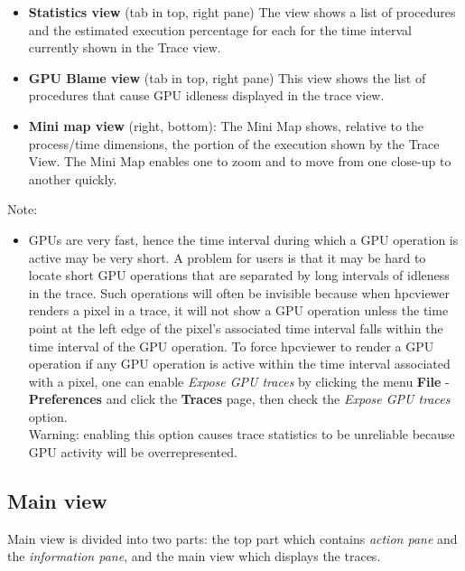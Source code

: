 \documentclass[english]{article}
\begin{document}
\begin{itemize}
\item \textbf{Statistics view} (tab in top, right pane)
  The view shows a list of procedures and the estimated execution percentage for each for the time interval currently shown in the Trace view.

\item \textbf{GPU Blame view} (tab in top, right pane)
	This view shows the list of procedures that cause GPU idleness displayed in the trace view.


\item \textbf{Mini map view} (right, bottom):
  The Mini Map shows, relative to the process/time dimensions, the portion of the execution shown by the Trace View.
  The Mini Map enables one to zoom and to move from one close-up to another quickly.

\end{itemize}
Note:
\begin{itemize}
\item GPUs are very fast, hence the time interval during which a GPU operation is active may be very short. A problem for users is that it may be hard to locate short GPU operations that are separated by long intervals of idleness in the trace. Such operations will often be invisible because
 when hpcviewer renders a pixel in a trace, it will not show a GPU operation unless the time point at the left edge of the pixel's associated time interval falls within the time interval of the GPU operation.
 	To force hpcviewer to render a GPU operation if any GPU operation is active within the time interval associated with a pixel, one can enable \emph{Expose GPU traces} by clicking the menu \textbf{File} - \textbf{Preferences} and click the \textbf{Traces} page, then check the \emph{Expose GPU traces} option.
\\
Warning: enabling this option causes trace statistics to be unreliable because GPU activity will be overrepresented.
\end{itemize}




\subsection{Main view}

Main view is divided into two parts: the top part which contains \emph{action pane} and the \emph{information pane}, and the main view which displays the traces.
\end{document}
